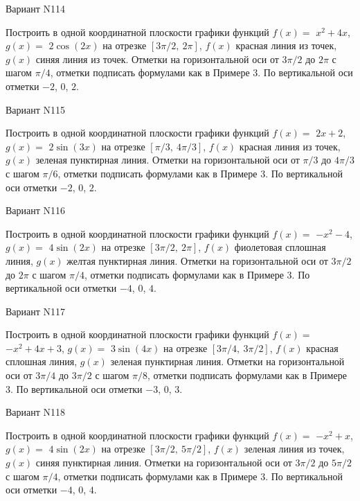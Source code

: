 \documentclass[11pt]{report}
\begin{document}
Вариант N114

Построить в одной координатной плоскости графики функций $f(x) = $
    $x^{2} + 4 x$, $g(x) = $
    $2 \cos{\left(2 x \right)}$ на 
    отрезке $\left[ 3 \pi / 2, \  2 \pi\right]$, $f(x)$ красная 
    линия из точек, $g(x)$ синяя линия из точек. 
    Отметки на горизонтальной оси от $3 \pi / 2$ до $2 \pi$ с 
    шагом $\pi / 4$, отметки подписать формулами как в Примере 3.  
    По вертикальной оси отметки $-2$, 0, $2$.

Вариант N115

Построить в одной координатной плоскости графики функций $f(x) = $
    $2 x + 2$, $g(x) = $
    $2 \sin{\left(3 x \right)}$ на 
    отрезке $\left[ \pi / 3, \  4 \pi / 3\right]$, $f(x)$ красная 
    линия из точек, $g(x)$ зеленая пунктирная линия. 
    Отметки на горизонтальной оси от $\pi / 3$ до $4 \pi / 3$ с 
    шагом $\pi / 6$, отметки подписать формулами как в Примере 3.  
    По вертикальной оси отметки $-2$, 0, $2$.

Вариант N116

Построить в одной координатной плоскости графики функций $f(x) = $
    $- x^{2} - 4$, $g(x) = $
    $4 \sin{\left(2 x \right)}$ на 
    отрезке $\left[ 3 \pi / 2, \  2 \pi\right]$, $f(x)$ фиолетовая 
    сплошная линия, $g(x)$ желтая пунктирная линия. 
    Отметки на горизонтальной оси от $3 \pi / 2$ до $2 \pi$ с 
    шагом $\pi / 4$, отметки подписать формулами как в Примере 3.  
    По вертикальной оси отметки $-4$, 0, $4$.

Вариант N117

Построить в одной координатной плоскости графики функций $f(x) = $
    $- x^{2} + 4 x + 3$, $g(x) = $
    $3 \sin{\left(4 x \right)}$ на 
    отрезке $\left[ 3 \pi / 4, \  3 \pi / 2\right]$, $f(x)$ красная 
    сплошная линия, $g(x)$ зеленая пунктирная линия. 
    Отметки на горизонтальной оси от $3 \pi / 4$ до $3 \pi / 2$ с 
    шагом $\pi / 8$, отметки подписать формулами как в Примере 3.  
    По вертикальной оси отметки $-3$, 0, $3$.

Вариант N118

Построить в одной координатной плоскости графики функций $f(x) = $
    $- x^{2} + x$, $g(x) = $
    $4 \sin{\left(2 x \right)}$ на 
    отрезке $\left[ 3 \pi / 2, \  5 \pi / 2\right]$, $f(x)$ зеленая 
    линия из точек, $g(x)$ синяя пунктирная линия. 
    Отметки на горизонтальной оси от $3 \pi / 2$ до $5 \pi / 2$ с 
    шагом $\pi / 4$, отметки подписать формулами как в Примере 3.  
    По вертикальной оси отметки $-4$, 0, $4$.
\end{document}
